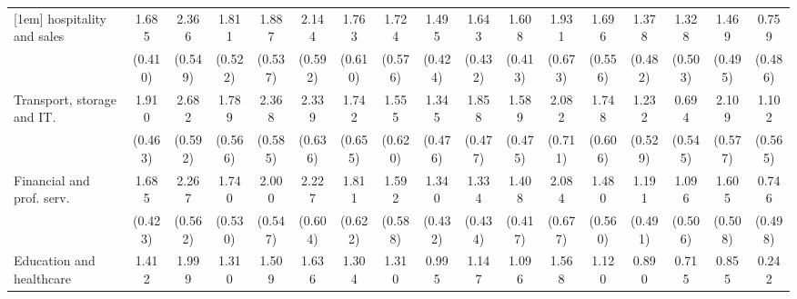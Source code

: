 {\begin{tabular}{l*{16}{c}}
[1em]
hospitality and sales&       1.685\sym{***}&       2.366\sym{***}&       1.811\sym{***}&       1.887\sym{***}&       2.144\sym{***}&       1.763\sym{**} &       1.724\sym{**} &       1.495\sym{***}&       1.643\sym{***}&       1.608\sym{***}&       1.931\sym{**} &       1.696\sym{**} &       1.378\sym{**} &       1.328\sym{**} &       1.469\sym{**} &       0.759         \\
                    &     (0.410)         &     (0.549)         &     (0.522)         &     (0.537)         &     (0.592)         &     (0.610)         &     (0.576)         &     (0.424)         &     (0.432)         &     (0.413)         &     (0.673)         &     (0.556)         &     (0.482)         &     (0.503)         &     (0.495)         &     (0.486)         \\
[1em]
Transport, storage and IT.&       1.910\sym{***}&       2.682\sym{***}&       1.789\sym{**} &       2.368\sym{***}&       2.339\sym{***}&       1.742\sym{**} &       1.555\sym{*}  &       1.345\sym{**} &       1.858\sym{***}&       1.589\sym{***}&       2.082\sym{**} &       1.748\sym{**} &       1.232\sym{*}  &       0.694         &       2.109\sym{***}&       1.102         \\
                    &     (0.463)         &     (0.592)         &     (0.566)         &     (0.585)         &     (0.636)         &     (0.655)         &     (0.620)         &     (0.476)         &     (0.477)         &     (0.475)         &     (0.711)         &     (0.606)         &     (0.529)         &     (0.545)         &     (0.577)         &     (0.565)         \\
[1em]
Financial and prof. serv.&       1.685\sym{***}&       2.267\sym{***}&       1.740\sym{**} &       2.000\sym{***}&       2.227\sym{***}&       1.811\sym{**} &       1.592\sym{**} &       1.340\sym{**} &       1.334\sym{**} &       1.408\sym{***}&       2.084\sym{**} &       1.480\sym{**} &       1.191\sym{*}  &       1.096\sym{*}  &       1.605\sym{**} &       0.746         \\
                    &     (0.423)         &     (0.562)         &     (0.530)         &     (0.547)         &     (0.604)         &     (0.622)         &     (0.588)         &     (0.432)         &     (0.434)         &     (0.417)         &     (0.677)         &     (0.560)         &     (0.491)         &     (0.506)         &     (0.508)         &     (0.498)         \\
[1em]
Education and healthcare&       1.412\sym{***}&       1.999\sym{***}&       1.310\sym{*}  &       1.509\sym{**} &       1.636\sym{**} &       1.304\sym{*}  &       1.310\sym{*}  &       0.995\sym{*}  &       1.147\sym{**} &       1.096\sym{**} &       1.568\sym{*}  &       1.120\sym{*}  &       0.890         &       0.715         &       0.855         &       0.242         \\

\end{tabular}}
